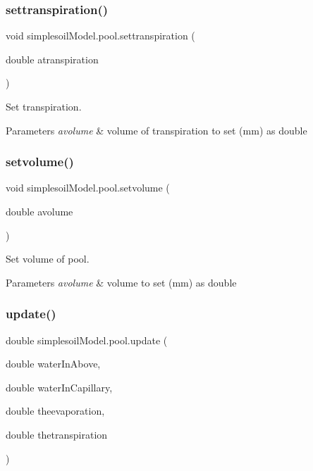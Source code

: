 \subsubsection{\texorpdfstring{settranspiration()}{settranspiration()}}
{\footnotesize\ttfamily void simplesoil\+Model.\+pool.\+settranspiration (\begin{DoxyParamCaption}\item[{double}]{atranspiration }\end{DoxyParamCaption})\hspace{0.3cm}{\ttfamily [inline]}}



Set transpiration. 


\begin{DoxyParams}{Parameters}
{\em avolume} & volume of transpiration to set (mm) as double \\
\hline
\end{DoxyParams}
\mbox{\label{classsimplesoil_model_1_1pool_a2459746f840a3d2a6de1748cd430aafc}} 
\subsubsection{\texorpdfstring{setvolume()}{setvolume()}}
{\footnotesize\ttfamily void simplesoil\+Model.\+pool.\+setvolume (\begin{DoxyParamCaption}\item[{double}]{avolume }\end{DoxyParamCaption})\hspace{0.3cm}{\ttfamily [inline]}}



Set volume of pool. 


\begin{DoxyParams}{Parameters}
{\em avolume} & volume to set (mm) as double \\
\hline
\end{DoxyParams}
\mbox{\label{classsimplesoil_model_1_1pool_a5b7b5a3ce11f8db111e79c4726552001}} 
\subsubsection{\texorpdfstring{update()}{update()}}
{\footnotesize\ttfamily double simplesoil\+Model.\+pool.\+update (\begin{DoxyParamCaption}\item[{double}]{water\+In\+Above,  }\item[{double}]{water\+In\+Capillary,  }\item[{double}]{theevaporation,  }\item[{double}]{thetranspiration }\end{DoxyParamCaption})\hspace{0.3cm}{\ttfamily [inline]}}


